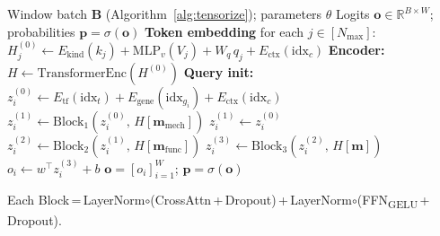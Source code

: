 \documentclass{article}
\begin{document}
\begin{algorithm}[H]
\caption{TF-EAGER Forward Pass (Staged Cross-Attention)}
\label{alg:forward}
\begin{algorithmic}[1]
\Require Window batch $\mathbf{B}$ (Algorithm~\ref{alg:tensorize}); parameters $\theta$
\Ensure  Logits $\mathbf{o} \in \mathbb{R}^{B \times W}$;\; probabilities $\mathbf{p} = \sigma(\mathbf{o})$
\State \textbf{Token embedding} for each $j \in [N_{\max}]$:
\Statex \quad $H^{(0)}_j \leftarrow E_{\mathrm{kind}}(k_j) + \mathrm{MLP}_v(V_j) + W_q\, q_j + E_{\mathrm{ctx}}(\mathrm{idx}_c)$
\State \textbf{Encoder:}\; $H \leftarrow \mathrm{TransformerEnc}(H^{(0)})$
  \State \textbf{Query init:}\;
         $z_i^{(0)} \leftarrow E_{\mathrm{tf}}(\mathrm{idx}_t) + E_{\mathrm{gene}}(\mathrm{idx}_{g_i}) + E_{\mathrm{ctx}}(\mathrm{idx}_c)$
    \State $z_i^{(1)} \leftarrow \mathrm{Block}_1(z_i^{(0)},\, H[\mathbf{m}_{\mathrm{mech}}])$
  \Else
    \State $z_i^{(1)} \leftarrow z_i^{(0)}$
  \EndIf
  \State $z_i^{(2)} \leftarrow \mathrm{Block}_2(z_i^{(1)},\, H[\mathbf{m}_{\mathrm{func}}])$
  \State $z_i^{(3)} \leftarrow \mathrm{Block}_3(z_i^{(2)},\, H[\mathbf{m}])$
  \State $o_i \leftarrow w^{\top} z_i^{(3)} + b$
\EndFor
\State \Return $\mathbf{o} = [o_i]_{i=1}^{W}$;\; $\mathbf{p} = \sigma(\mathbf{o})$
\end{algorithmic}
\smallskip
\noindent\small
Each Block\,=\,LayerNorm$\circ$(CrossAttn\,+\,Dropout)\,+\,LayerNorm$\circ$(FFN\textsubscript{GELU}\,+\,Dropout).
\end{algorithm}
\end{document}
